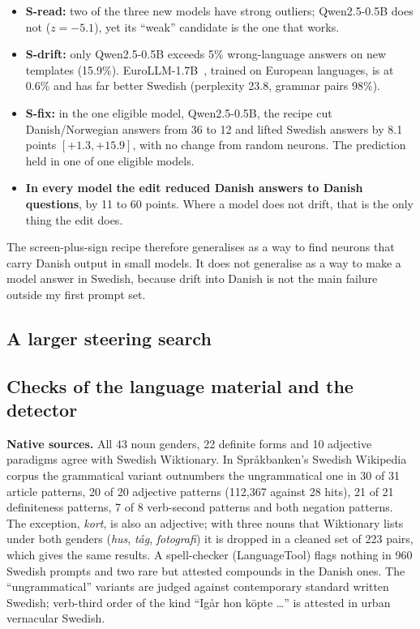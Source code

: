 \documentclass[10pt,a4paper]{article}
\begin{document}
\begin{itemize}
\item \textbf{S-read:} two of the three new models have strong outliers; Qwen2.5-0.5B does not ($z=-5.1$), yet its ``weak'' candidate is the one that works.
\item \textbf{S-drift:} only Qwen2.5-0.5B exceeds 5\% wrong-language answers on new templates (15.9\%). EuroLLM-1.7B~\cite{martins2024}, trained on European languages, is at 0.6\% and has far better Swedish (perplexity 23.8, grammar pairs 98\%).
\item \textbf{S-fix:} in the one eligible model, Qwen2.5-0.5B, the recipe cut Danish/Norwegian answers from 36 to 12 and lifted Swedish answers by 8.1 points $[+1.3,+15.9]$, with no change from random neurons. The prediction held in one of one eligible models.
\item \textbf{In every model the edit reduced Danish answers to Danish questions}, by 11 to 60 points. Where a model does not drift, that is the only thing the edit does.
\end{itemize}
The screen-plus-sign recipe therefore generalises as a way to find neurons that carry Danish output in small models. It does not generalise as a way to make a model answer in Swedish, because drift into Danish is not the main failure outside my first prompt set.

\subsection{A larger steering search}
\STwoText

\subsection{Checks of the language material and the detector}\label{sec:lang}

\textbf{Native sources.} All 43 noun genders, 22 definite forms and 10 adjective paradigms agree with Swedish Wiktionary. In Språkbanken's Swedish Wikipedia corpus the grammatical variant outnumbers the ungrammatical one in
30 of 31 article patterns, 20 of 20 adjective patterns (112,367 against 28 hits), 21 of 21 definiteness patterns, 7 of 8 verb-second patterns and both negation patterns.
The exception, \emph{kort}, is also an adjective; with three nouns that Wiktionary lists under both genders (\emph{hus}, \emph{tåg}, \emph{fotografi}) it is dropped in a cleaned set of 223 pairs, which gives the same results.
A spell-checker (LanguageTool) flags nothing in 960 Swedish prompts and two rare but attested compounds in the Danish ones.
The ``ungrammatical'' variants are judged against contemporary standard written Swedish; verb-third order of the kind ``Igår hon köpte \dots'' is attested in urban vernacular Swedish.
\end{document}
